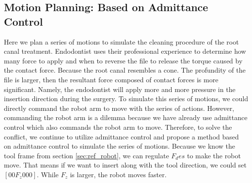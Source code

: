 \subsection{Motion Planning: Based on Admittance Control}
\label{sec:motion planning} 
\hspace*{6mm}Here we plan a series of motions to simulate the cleaning procedure of the root canal treatment. Endodontist uses their professional experience to determine how many force to apply and when to reverse the file to release the torque caused by the contact force. Because the root canal resembles a cone. The profundity of the file is larger, then the resultant force composed of contact forces is more significant. Namely, the endodontist will apply more and more pressure in the insertion direction during the surgery. To simulate this series of motions, we could directly command the robot arm to move with the series of actions. However, commanding the robot arm is a dilemma because we have already use admittance control which also commands the robot arm to move. Therefore, to solve the conflict, we continue to utilize admittance control and propose a method based on admittance control to simulate the series of motions. Because we know the tool frame from section \ref{sec:ref_robot}, we can regulate $F_des$ to make the robot move. That means if we want to insert along with the tool direction, we could set $[0 0 F_z 0 0 0]$. While $F_z$ is larger, the robot moves faster.

